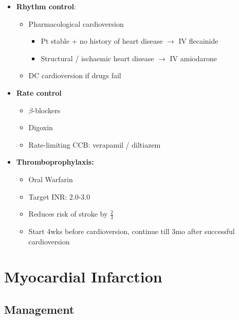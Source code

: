 \documentclass[
  12pt,
]{memoir}
\providecommand{\tightlist}{%
  \setlength{\itemsep}{0pt}\setlength{\parskip}{0pt}}
\begin{document}
\begin{itemize}
\tightlist
\item
  \textbf{Rhythm control}:

  \begin{itemize}
  \tightlist
  \item
    Pharmacological cardioversion

    \begin{itemize}
    \tightlist
    \item
      Pt stable + no history of heart disease \(\rightarrow\) IV
      flecainide
    \item
      Structural / ischaemic heart disease \(\rightarrow\) IV amiodarone
    \end{itemize}
  \item
    DC cardioversion if drugs fail
  \end{itemize}
\item
  \textbf{Rate control}

  \begin{itemize}
  \tightlist
  \item
    \(\beta\)-blockers
  \item
    Digoxin
  \item
    Rate-limiting CCB: verapamil / diltiazem
  \end{itemize}
\item
  \textbf{Thromboprophylaxis:}

  \begin{itemize}
  \tightlist
  \item
    Oral Warfarin
  \item
    Target INR: 2.0-3.0
  \item
    Reduces risk of stroke by \(\frac{2}{3}\)
  \item
    Start 4wks before cardioversion, continue till 3mo after successful
    cardioversion
  \end{itemize}
\end{itemize}

\pagebreak

\hypertarget{myocardial-infarction-1}{%
\section{Myocardial Infarction}\label{myocardial-infarction-1}}

\hypertarget{management}{%
\subsection{Management}\label{management}}
\end{document}
